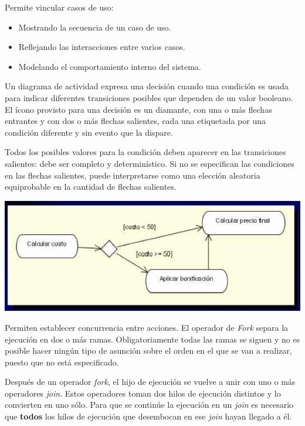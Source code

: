 \documentclass[]{article}
\begin{document}
Permite vincular casos de uso:
\begin{itemize}
	\item Mostrando la secuencia de un caso de uso.
	\item Reflejando las interacciones entre varios casos.
	\item Modelando el comportamiento interno del sistema.
\end{itemize}

Un diagrama de actividad expresa una decisión cuando una condición es usada para indicar diferentes transiciones posibles que dependen de un valor booleano. El ícono provisto para una decisión es un diamante, con una o más flechas entrantes y con dos o más flechas salientes, cada una etiquetada por una condición diferente y sin evento que la dispare.

Todos los posibles valores para la condición deben aparecer en las transiciones salientes: debe ser completo y determinístico. Si no se especifican las condiciones en las flechas salientes, puede interpretarse como una elección aleatoria equiprobable en la cantidad de flechas salientes.

\begin{center}
	\includegraphics[scale=0.5]{ActivDeci.png}
\end{center}

Permiten establecer concurrencia entre acciones. El operador de \textit{Fork} separa la ejecución en dos o más ramas. Obligatoriamente todas las ramas se siguen y no es posible hacer ningún tipo de asunción sobre el orden en el que se van a realizar, puesto que no está especificado.

Después de un operador \textit{fork}, el hijo de ejecución se vuelve a unir con uno o más operadores \textit{join}. Estos operadores toman dos hilos de ejecución distintos y lo convierten en uno sólo. Para que se continúe la ejecución en un \textit{join} es necesario que \textbf{todos} los hilos de ejecución que desembocan en ese \textit{join} hayan llegado a él.
\end{document}
